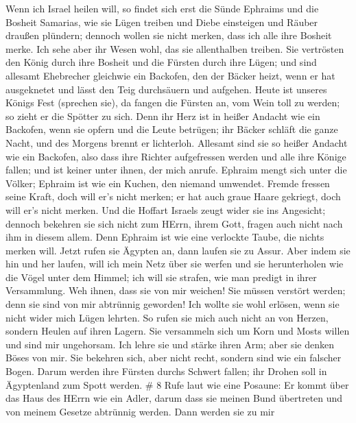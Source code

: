 Wenn ich Israel heilen will, so findet sich erst die Sünde Ephraims und
die Bosheit Samarias, wie sie Lügen treiben und Diebe einsteigen und
Räuber draußen plündern;  dennoch wollen sie nicht merken,
dass ich alle ihre Bosheit merke. Ich sehe aber ihr Wesen wohl, das sie
allenthalben treiben.  Sie vertrösten den König durch ihre
Bosheit und die Fürsten durch ihre Lügen;  und sind allesamt
Ehebrecher gleichwie ein Backofen, den der Bäcker heizt, wenn er hat
ausgeknetet und lässt den Teig durchsäuern und aufgehen. 
Heute ist unseres Königs Fest (sprechen sie), da fangen die Fürsten an,
vom Wein toll zu werden; so zieht er die Spötter zu sich. 
Denn ihr Herz ist in heißer Andacht wie ein Backofen, wenn sie opfern
und die Leute betrügen; ihr Bäcker schläft die ganze Nacht, und des
Morgens brennt er lichterloh.  Allesamt sind sie so heißer
Andacht wie ein Backofen, also dass ihre Richter aufgefressen werden und
alle ihre Könige fallen; und ist keiner unter ihnen, der mich anrufe.
 Ephraim mengt sich unter die Völker; Ephraim ist wie ein
Kuchen, den niemand umwendet.  Fremde fressen seine Kraft,
doch will er's nicht merken; er hat auch graue Haare gekriegt, doch will
er's nicht merken.  Und die Hoffart Israels zeugt wider sie
ins Angesicht; dennoch bekehren sie sich nicht zum HErrn, ihrem Gott,
fragen auch nicht nach ihm in diesem allem.  Denn Ephraim
ist wie eine verlockte Taube, die nichts merken will. Jetzt rufen sie
Ägypten an, dann laufen sie zu Assur.  Aber indem sie hin
und her laufen, will ich mein Netz über sie werfen und sie herunterholen
wie die Vögel unter dem Himmel; ich will sie strafen, wie man predigt in
ihrer Versammlung.  Weh ihnen, dass sie von mir weichen!
Sie müssen verstört werden; denn sie sind von mir abtrünnig geworden!
Ich wollte sie wohl erlösen, wenn sie nicht wider mich Lügen lehrten.
 So rufen sie mich auch nicht an von Herzen, sondern Heulen
auf ihren Lagern. Sie versammeln sich um Korn und Mosts willen und sind
mir ungehorsam.  Ich lehre sie und stärke ihren Arm; aber
sie denken Böses von mir.  Sie bekehren sich, aber nicht
recht, sondern sind wie ein falscher Bogen. Darum werden ihre Fürsten
durchs Schwert fallen; ihr Drohen soll in Ägyptenland zum Spott werden.
\# 8  Rufe laut wie eine Posaune: Er kommt über das Haus des
HErrn wie ein Adler, darum dass sie meinen Bund übertreten und von
meinem Gesetze abtrünnig werden.  Dann werden sie zu mir
